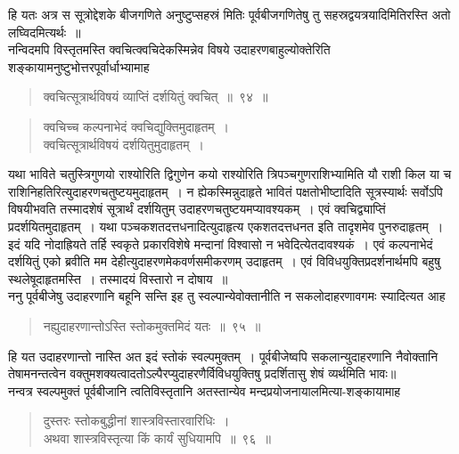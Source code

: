 \documentclass[11pt, openany]{book}
\begin{document}
हि यतः अत्र स सूत्रोद्देशके बीजगणिते अनुष्टुप्सहस्रं मितिः
पूर्वबीजगणितेषु तु सहस्रद्वयत्रयादिमितिरस्ति अतो लघ्विदमित्यर्थः~॥ \\

\vspace{-3mm}
 नन्विदमपि विस्तृतमस्ति क्वचित्क्वचिदेकस्मिन्नेव विषये उदाहरणबाहुल्योक्तेरिति शङ्कायामनुष्टुभोत्तरपूर्वार्धाभ्यामाह\textendash 
\begin{quote}
    \bs
     क्वचित्सूत्रार्थविषयं व्याप्तिं दर्शयितुं क्वचित्~॥~९४~॥
\end{quote}

\afterpage{\fancyhead[RO,LE]{\thepage}}
\cfoot{}
\thispagestyle{empty}
\newpage
\begin{quote}
    \bs
    क्वचिच्च कल्पनाभेदं क्वचिद्युक्तिमुदाहृतम्~। \\
 क्वचित्सूत्रार्थविषयं दर्शयितुमुदाहृतम्~। 
\end{quote}

यथा भाविते चतुस्त्रिगुणयो राश्योरिति द्विगुणेन कयो राश्योरिति
त्रिपञ्चगुणराशिभ्यामिति यौ राशी किल या च राशिनिहतिरित्युदाहरणचतुष्टयमुदाहृतम्~। 
न ह्येकस्मिन्नुदाहृते भावितं पक्षतोभीष्टादिति सूत्रस्यार्थः सर्वोऽपि
विषयीभवति तस्मादशेषं सूत्रार्थं दर्शयितुम् उदाहरणचतुष्टयमप्यावश्यकम्~। एवं क्वचिद्व्याप्तिं प्रदर्शयितमुदाहृतम्~। यथा पञ्चकशतदत्तधनादित्युदाहृत्य एकशतदत्तधनत इति तादृशमेव पुनरुदाहृतम्~। इदं यदि नोदाह्रियते तर्हि स्वकृते प्रकारविशेषे मन्दानां विश्वासो न भवेदित्येतदावश्यकं~। एवं कल्पनाभेदं दर्शयितुं एको ब्रवीति मम देहीत्युदाहरणमेकवर्णसमीकरणम् उदाहृतम्~। एवं विविधयुक्तिप्रदर्शनार्थमपि बहुषु स्थलेषूदाहृतमस्ति~। तस्मादयं विस्तारो न दोषाय~॥ \\

\vspace{-3mm}
 ननु पूर्वबीजेषु उदाहरणानि बहूनि सन्ति इह तु स्वल्पान्येवोक्तानीति न सकलोदाहरणावगमः स्यादित्यत आह\textendash 
\begin{quote}
    \bs
     नह्युदाहरणान्तोऽस्ति स्तोकमुक्तमिदं यतः~॥~९५~॥~
\end{quote}

हि यत उदाहरणान्तो नास्ति अत इदं स्तोकं स्वल्पमुक्तम्~। पूर्वबीजेष्वपि 
सकलान्युदाहरणानि नैवोक्तानि तेषामनन्तत्वेन
वक्तुमशक्यत्वादतोऽल्पैरप्युदाहरणैर्विविधयुक्तिषु प्रदर्शितासु शेषं व्यर्थमिति भावः॥ \\

\vspace{-3mm}
 नन्वत्र स्वल्पमुक्तं पूर्वबीजानि त्वतिविस्तृतानि अतस्तान्येव 
मन्दप्रयोजनायालमित्या-शङ्कायामाह\textendash 
\begin{quote}
    \bs
  दुस्तरः स्तोकबुद्धीनां शास्त्रविस्तारवारिधिः~। \\
 अथवा शास्त्रविस्तृत्या किं कार्यं सुधियामपि~॥~९६~॥~
\end{quote}
\end{document}
